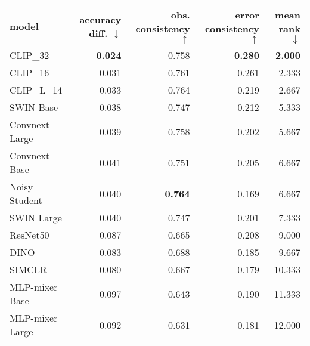 \begin{tabular}{lrrrr}
\toprule
          model & accuracy diff. $\downarrow$ & obs. consistency $\uparrow$ & error consistency $\uparrow$ & mean rank $\downarrow$ \\
\midrule
       CLIP\_32 &              \textbf{0.024} &                       0.758 &               \textbf{0.280} &         \textbf{2.000} \\
       CLIP\_16 &                       0.031 &                       0.761 &                        0.261 &                  2.333 \\
    CLIP\_L\_14 &                       0.033 &                       0.764 &                        0.219 &                  2.667 \\
      SWIN Base &                       0.038 &                       0.747 &                        0.212 &                  5.333 \\
 Convnext Large &                       0.039 &                       0.758 &                        0.202 &                  5.667 \\
  Convnext Base &                       0.041 &                       0.751 &                        0.205 &                  6.667 \\
  Noisy Student &                       0.040 &              \textbf{0.764} &                        0.169 &                  6.667 \\
     SWIN Large &                       0.040 &                       0.747 &                        0.201 &                  7.333 \\
       ResNet50 &                       0.087 &                       0.665 &                        0.208 &                  9.000 \\
           DINO &                       0.083 &                       0.688 &                        0.185 &                  9.667 \\
         SIMCLR &                       0.080 &                       0.667 &                        0.179 &                 10.333 \\
 MLP-mixer Base &                       0.097 &                       0.643 &                        0.190 &                 11.333 \\
MLP-mixer Large &                       0.092 &                       0.631 &                        0.181 &                 12.000 \\
\bottomrule
\end{tabular}

